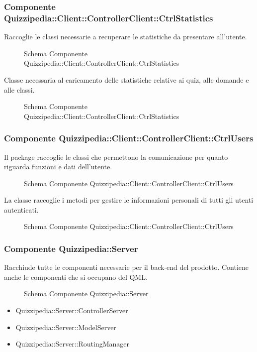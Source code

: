 \subsubsection{Componente Quizzipedia::Client::ControllerClient::CtrlStatistics}
Raccoglie le classi necessarie a recuperare le statistiche da presentare all'utente.
\begin{figure}[H]
\centering
\noindent{}
\caption{Schema Componente Quizzipedia::Client::ControllerClient::CtrlStatistics}
\end{figure}
Classe necessaria al caricamento delle statistiche relative ai quiz, alle domande e alle classi.
\begin{figure}[H]
\centering
\noindent{}
\caption{Schema Componente Quizzipedia::Client::ControllerClient::CtrlStatistics}
\end{figure}
\subsubsection{Componente Quizzipedia::Client::ControllerClient::CtrlUsers}
Il package raccoglie le classi che permettono la comunicazione per quanto riguarda funzioni e dati dell'utente.
\begin{figure}[H]
\centering
\noindent{}
\caption{Schema Componente Quizzipedia::Client::ControllerClient::CtrlUsers}
\end{figure}
La classe raccoglie i metodi per gestire le informazioni personali di tutti gli utenti autenticati.
\begin{figure}[H]
\centering
\noindent{}
\caption{Schema Componente Quizzipedia::Client::ControllerClient::CtrlUsers}
\end{figure}
\subsubsection{Componente Quizzipedia::Server}
Racchiude tutte le componenti necessarie per il back-end del prodotto. Contiene anche le componenti che si occupano del QML.
\begin{figure}[H]
\centering
\noindent{}
\caption{Schema Componente Quizzipedia::Server}
\end{figure}
\begin{itemize}
\item Quizzipedia::Server::ControllerServer
\item Quizzipedia::Server::ModelServer
\item Quizzipedia::Server::RoutingManager
\end{itemize}
